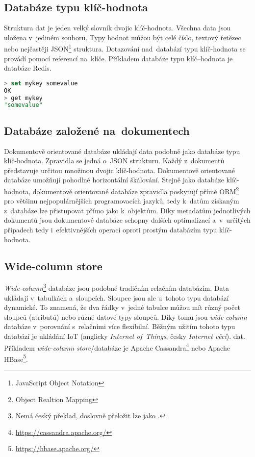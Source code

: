 \subsection{Databáze typu klíč-hodnota}
\label{subsection:key_value_databases}
Struktura dat je jeden velký slovník dvojic klíč-hodnota. Všechna data jsou uložena v~jediném souboru. Typy hodnot
můžou být celé číslo, textový řetězec nebo nejčastěji JSON\footnote{JavaScript Object Notation} struktura.
Dotazování nad~databází typu klíč-hodnota se provádí pomocí referencí na~klíče.
Příkladem databáze typu klíč--hodnota je databáze Redis.
\begin{lstlisting}[language=SQL, basicstyle=\scriptsize\ttfamily, caption=Příklad vložení hodnoty do~Redis databáze pod daným klíčem a~následné získání této hodnoty referencí pomocí klíče.~\cite{RedisIntro}]
> set mykey somevalue
OK
> get mykey
"somevalue"
\end{lstlisting}

\subsection{Databáze založené na~dokumentech}
\label{subsection:document_databases}
Dokumentově orientované databáze ukládají data podobně jako databáze typu klíč-hodnota. Zpravidla se jedná o~JSON
strukturu. Každý z~dokumentů představuje určitou množinou dvojic klíč-hodnota. Dokumentově orientované databáze
umožňují pohodlné horizontální škálování. Stejně jako databáze klíč-hodnota, dokumentově orientované databáze
zpravidla poskytují přímé ORM\footnote{Object Realtion Mapping} pro většinu nejpopulárnějších programovacích jazyků,
tedy k~datům získaným z~databáze lze přistupovat přímo jako k~objektům. Díky metadatům jednotlivých dokumentů jsou
dokumentové databáze schopny dalších optimalizací a~v~určitých případech tedy i~efektivnějších operací oproti
prostým databázím typu klíč-hodnota.~\cite{NoSQLExplained}

\subsection{Wide-column store}
\label{subsection:wide_column_store}
\textit{Wide-column}\footnote{Nemá český překlad, doslovně přeložit lze jako .} databáze jsou
podobné tradičním relačním databázím. Data ukládají v~tabulkách a~sloupcích. Sloupce jsou ale u~tohoto typu databází
dynamické. To znamená, že dva řádky v~jedné tabulce můžou mít různý počet sloupců (atributů) nebo různé datové typy
sloupců. Díky tomu jsou \textit{wide-column} databáze v~porovnání s~relačními více flexibilní. Běžným užitím tohoto
typu databází je ukládání IoT (anglicky \textit{Internet of~Things}, česky \textit{Internet věcí}). dat. Příkladem \textit{wide-column
store}/databáze je Apache Cassandra\footnote{\href{https://cassandra.apache.org/}{https://cassandra.apache.org/}} nebo Apache HBase\footnote{\href{https://hbase.apache.org/}{https://hbase.apache.org/}}.

